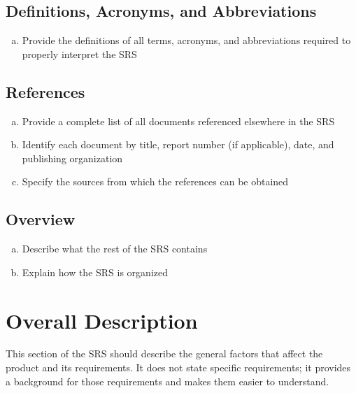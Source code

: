 \documentclass[english]{article}
\begin{document}
\subsection{Definitions, Acronyms, and Abbreviations}
\label{sub:definitions_acronyms_and_abbreviations}
\begin{enumerate}[a)]
	\item Provide the definitions of all terms, acronyms, and abbreviations required to properly interpret the SRS
\end{enumerate}

\subsection{References}
\label{sub:references}
\begin{enumerate}[a)]
	\item Provide a complete list of all documents referenced elsewhere in the SRS
	\item Identify each document by title, report number (if applicable), date, and publishing organization
	\item Specify the sources from which the references can be obtained
\end{enumerate}

\subsection{Overview}
\label{sub:overview}
\begin{enumerate}[a)]
	\item Describe what the rest of the SRS contains
	\item Explain how the SRS is organized
\end{enumerate}


\section{Overall Description}
\label{sec:overall_description}

This section of the SRS should describe the general factors that affect the product and its requirements. It does not state specific requirements; it provides a background for those requirements and makes them easier to understand.
\end{document}
